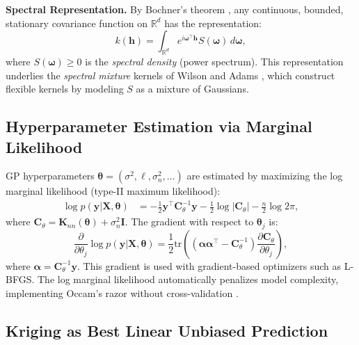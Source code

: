 \documentclass[conference]{IEEEtran}
\begin{document}
\textbf{Spectral Representation.} By Bochner's theorem \cite{bochner1933monotone}, any continuous, bounded, stationary covariance function on $\mathbb{R}^d$ has the representation:
\begin{equation}
  k(\mathbf{h}) = \int_{\mathbb{R}^d} e^{i\bm{\omega}^\top \mathbf{h}} S(\bm{\omega})\, d\bm{\omega},
  \label{eq:bochner}
\end{equation}
where $S(\bm{\omega}) \geq 0$ is the \emph{spectral density} (power spectrum). This representation underlies the \emph{spectral mixture} kernels of Wilson and Adams \cite{wilson2013gaussian}, which construct flexible kernels by modeling $S$ as a mixture of Gaussians.

\subsection{Hyperparameter Estimation via Marginal Likelihood}

GP hyperparameters $\bm{\theta} = (\sigma^2, \ell, \sigma_n^2, \ldots)$ are estimated by maximizing the log marginal likelihood (type-II maximum likelihood):
\begin{align}
  \log p(\mathbf{y} | \mathbf{X}, \bm{\theta}) &= -\frac{1}{2}\mathbf{y}^\top \mathbf{C}_\theta^{-1} \mathbf{y} - \frac{1}{2}\log|\mathbf{C}_\theta| - \frac{n}{2}\log 2\pi,
  \label{eq:log_mlik}
\end{align}
where $\mathbf{C}_\theta = \mathbf{K}_{nn}(\bm{\theta}) + \sigma_n^2 \mathbf{I}$. The gradient with respect to $\bm{\theta}_j$ is:
\begin{equation}
  \frac{\partial}{\partial \theta_j}\log p(\mathbf{y}|\mathbf{X},\bm{\theta}) = \frac{1}{2}\text{tr}\!\left(\left(\bm{\alpha}\bm{\alpha}^\top - \mathbf{C}_\theta^{-1}\right)\frac{\partial \mathbf{C}_\theta}{\partial \theta_j}\right),
  \label{eq:mlik_grad}
\end{equation}
where $\bm{\alpha} = \mathbf{C}_\theta^{-1}\mathbf{y}$. This gradient is used with gradient-based optimizers such as L-BFGS. The log marginal likelihood automatically penalizes model complexity, implementing Occam's razor without cross-validation \cite{rasmussen2006gaussian}.

\subsection{Kriging as Best Linear Unbiased Prediction}
\end{document}
